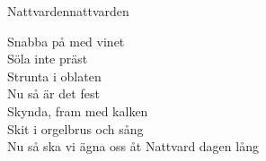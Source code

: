 \begin{song}{Nattvarden}{nattvarden}
\begin{vers}
Snabba på med vinet\\
Söla inte präst\\
Strunta i oblaten\\
Nu så är det fest\\
Skynda, fram med kalken\\
Skit i orgelbrus och sång\\
Nu så ska vi ägna oss åt Nattvard dagen lång\\
\end{vers}
\end{song}
